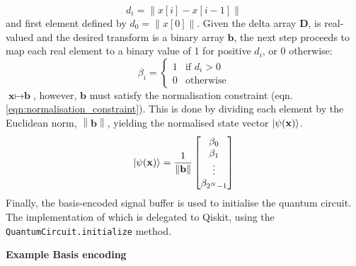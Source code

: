 \begin{equation}
    d_i = \lVert x[i] - x[i-1] \rVert
\end{equation}
% 
and first element defined by $d_0 = \lVert x[0] \rVert$.
% 
% 
Given the delta array $\textbf{D}$, is real-valued and the desired transform is a binary array $\textbf{b}$, the next step proceeds to map each real element to a binary value of 1 for positive $d_i$, or 0 otherwise:
% 
\begin{equation}
    \beta_i = \begin{cases}
        1 & \text{if } d_i > 0 \\
        0 & \text{otherwise}
    \end{cases}
\end{equation}
% 
% 
$\textbf{x} \mapsto \textbf{b}$, however, $\textbf{b}$ must satisfy the normalisation constraint (eqn. \ref{eqn:normalisation_constraint}).
This is done by dividing each element by the Euclidean norm, $\left\| \mathbf{b} \right\|$, yielding the normalised state vector $\left\vert{\psi (\textbf{x})}\right\rangle$.
% 
\begin{equation}
\displaystyle{
\ensuremath{\left\vert{\psi (\textbf{x})}\right\rangle} =
\frac{1}{\left\| \mathbf{b} \right\|}
\begin{bmatrix} \beta_0 \\ \beta_1 \\ \vdots \\ \beta_{2^N-1} \end{bmatrix}
}
\end{equation}
% 
Finally, the basis-encoded signal buffer is used to initialise the quantum circuit.
The implementation of which is delegated to Qiskit, using the \texttt{QuantumCircuit.initialize} method.

\textbf{Example Basis encoding}


